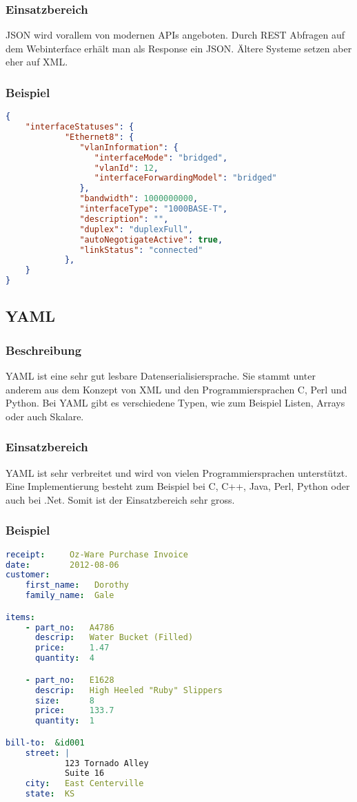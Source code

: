 \documentclass[a4,12pt]{scrartcl}
\begin{document}
\subsubsection{Einsatzbereich}
JSON wird vorallem von modernen APIs angeboten. Durch REST Abfragen auf dem Webinterface erhält man als Response ein JSON. Ältere Systeme setzen aber eher auf XML.
\subsubsection{Beispiel}
\begin{lstlisting}[language=json,firstnumber=1]
{
	"interfaceStatuses": {
            "Ethernet8": {
               "vlanInformation": {
                  "interfaceMode": "bridged",
                  "vlanId": 12,
                  "interfaceForwardingModel": "bridged"
               },
               "bandwidth": 1000000000,
               "interfaceType": "1000BASE-T",
               "description": "",
               "duplex": "duplexFull",
               "autoNegotigateActive": true,
               "linkStatus": "connected"
            },
	}
}
\end{lstlisting}

\subsection{YAML}
\subsubsection{Beschreibung}
YAML ist eine sehr gut lesbare Datenserialisiersprache. Sie stammt unter anderem aus dem Konzept von XML und den Programmiersprachen C, Perl und Python. Bei YAML gibt es verschiedene Typen, wie zum Beispiel Listen, Arrays oder auch Skalare.
\subsubsection{Einsatzbereich}
YAML ist sehr verbreitet und wird von vielen Programmiersprachen unterstützt. Eine Implementierung besteht zum Beispiel bei C, C++, Java, Perl, Python oder auch bei .Net. Somit ist der Einsatzbereich sehr gross.
\subsubsection{Beispiel}
\begin{lstlisting}[language=yaml]
receipt:     Oz-Ware Purchase Invoice
date:        2012-08-06
customer:
    first_name:   Dorothy
    family_name:  Gale

items:
    - part_no:   A4786
      descrip:   Water Bucket (Filled)
      price:     1.47
      quantity:  4

    - part_no:   E1628
      descrip:   High Heeled "Ruby" Slippers
      size:      8
      price:     133.7
      quantity:  1

bill-to:  &id001
    street: |
            123 Tornado Alley
            Suite 16
    city:   East Centerville
    state:  KS
\end{lstlisting}
\end{document}
